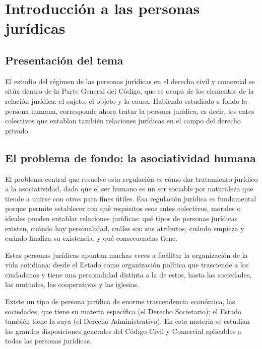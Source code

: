 \documentclass[12pt,oneside]{book}
\begin{document}
\chapter{Introducción a las personas jurídicas}

\section{Presentación del tema}

El estudio del régimen de las personas jurídicas en el derecho civil y comercial se sitúa dentro de la Parte General del Código, que se ocupa de los elementos de la relación jurídica: el sujeto, el objeto y la causa. Habiendo estudiado a fondo la persona humana, corresponde ahora tratar la persona jurídica, es decir, los entes colectivos que entablan también relaciones jurídicas en el campo del derecho privado.

\section{El problema de fondo: la asociatividad humana}

El problema central que resuelve esta regulación es cómo dar tratamiento jurídico a la asociatividad, dado que el ser humano es un ser sociable por naturaleza que tiende a unirse con otros para fines útiles. Esa regulación jurídica es fundamental porque permite establecer con qué requisitos esos entes colectivos, morales o ideales pueden entablar relaciones jurídicas: qué tipos de personas jurídicas existen, cuándo hay personalidad, cuáles son sus atributos, cuándo empieza y cuándo finaliza su existencia, y qué consecuencias tiene.

Estas personas jurídicas apuntan muchas veces a facilitar la organización de la vida cotidiana: desde el Estado como organización política que trasciende a los ciudadanos y tiene una personalidad distinta a la de estos, hasta las sociedades, las mutuales, las cooperativas y las iglesias.

\begin{note}
Existe un tipo de persona jurídica de enorme trascendencia económica, las sociedades, que tiene su materia específica (el Derecho Societario); el Estado también tiene la suya (el Derecho Administrativo). En esta materia se estudian las grandes disposiciones generales del Código Civil y Comercial aplicables a todas las personas jurídicas.
\end{note}
\end{document}
